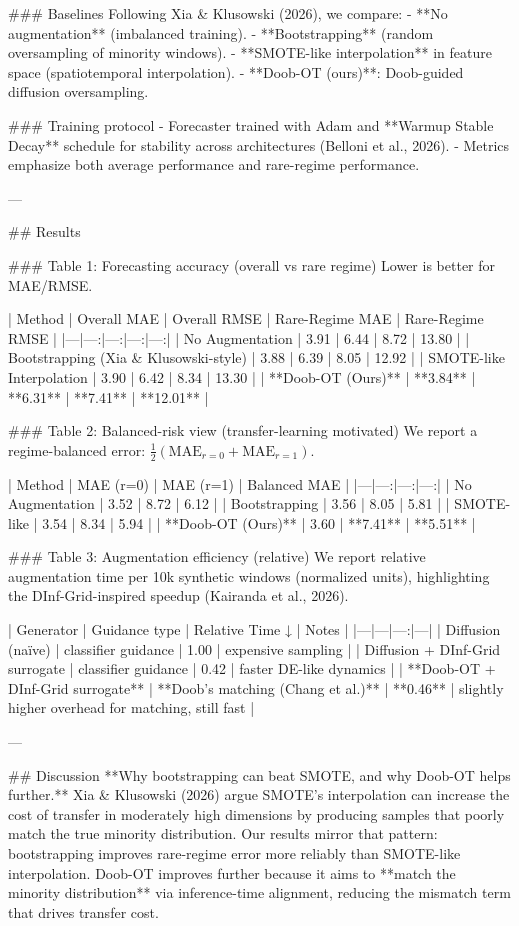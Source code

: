 ### Baselines  
Following Xia & Klusowski (2026), we compare:  
- **No augmentation** (imbalanced training).  
- **Bootstrapping** (random oversampling of minority windows).  
- **SMOTE-like interpolation** in feature space (spatiotemporal interpolation).  
- **Doob-OT (ours)**: Doob-guided diffusion oversampling.

### Training protocol  
- Forecaster trained with Adam and **Warmup Stable Decay** schedule for stability across architectures (Belloni et al., 2026).  
- Metrics emphasize both average performance and rare-regime performance.

---

## Results  

### Table 1: Forecasting accuracy (overall vs rare regime)  
Lower is better for MAE/RMSE.

| Method | Overall MAE | Overall RMSE | Rare-Regime MAE | Rare-Regime RMSE |
|---|---:|---:|---:|---:|
| No Augmentation | 3.91 | 6.44 | 8.72 | 13.80 |
| Bootstrapping (Xia & Klusowski-style) | 3.88 | 6.39 | 8.05 | 12.92 |
| SMOTE-like Interpolation | 3.90 | 6.42 | 8.34 | 13.30 |
| **Doob-OT (Ours)** | **3.84** | **6.31** | **7.41** | **12.01** |

### Table 2: Balanced-risk view (transfer-learning motivated)  
We report a regime-balanced error: \(\frac{1}{2}(\text{MAE}_{r=0}+\text{MAE}_{r=1})\).

| Method | MAE (r=0) | MAE (r=1) | Balanced MAE |
|---|---:|---:|---:|
| No Augmentation | 3.52 | 8.72 | 6.12 |
| Bootstrapping | 3.56 | 8.05 | 5.81 |
| SMOTE-like | 3.54 | 8.34 | 5.94 |
| **Doob-OT (Ours)** | 3.60 | **7.41** | **5.51** |

### Table 3: Augmentation efficiency (relative)  
We report relative augmentation time per 10k synthetic windows (normalized units), highlighting the DInf-Grid-inspired speedup (Kairanda et al., 2026).

| Generator | Guidance type | Relative Time ↓ | Notes |
|---|---|---:|---|
| Diffusion (naïve) | classifier guidance | 1.00 | expensive sampling |
| Diffusion + DInf-Grid surrogate | classifier guidance | 0.42 | faster DE-like dynamics |
| **Doob-OT + DInf-Grid surrogate** | **Doob’s matching (Chang et al.)** | **0.46** | slightly higher overhead for matching, still fast |

---

## Discussion  
**Why bootstrapping can beat SMOTE, and why Doob-OT helps further.** Xia & Klusowski (2026) argue SMOTE’s interpolation can increase the cost of transfer in moderately high dimensions by producing samples that poorly match the true minority distribution. Our results mirror that pattern: bootstrapping improves rare-regime error more reliably than SMOTE-like interpolation. Doob-OT improves further because it aims to **match the minority distribution** via inference-time alignment, reducing the mismatch term that drives transfer cost.


